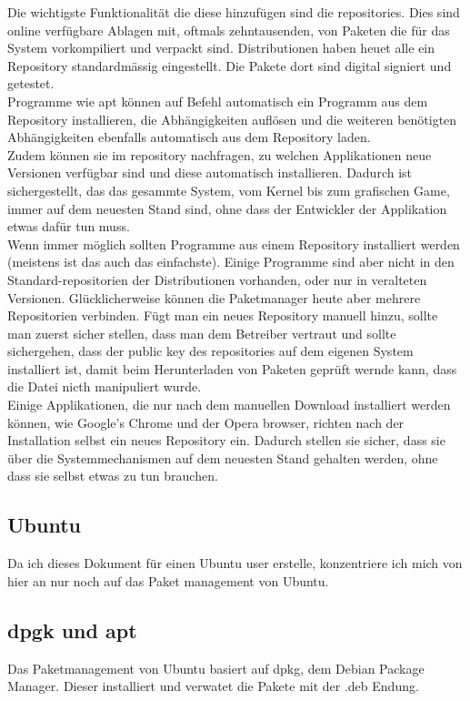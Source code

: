 \documentclass[10pt,paper=a4,final]{scrartcl}
\begin{document}
Die wichtigste Funktionalit\"at die diese hinzuf\"ugen sind die repositories. Dies sind online verf\"ugbare Ablagen mit, oftmals zehntausenden, von Paketen die f\"ur das System vorkompiliert und verpackt sind. Distributionen haben heuet alle ein Repository standardm\"assig eingestellt. Die Pakete dort sind digital signiert und getestet.\\
Programme wie apt k\"onnen auf Befehl automatisch ein Programm aus dem Repository installieren, die Abh\"angigkeiten aufl\"osen und die weiteren ben\"otigten Abh\"angigkeiten ebenfalls automatisch aus dem Repository laden.\\
Zudem k\"onnen sie im repository nachfragen, zu welchen Applikationen neue Versionen verf\"ugbar sind und diese automatisch installieren. Dadurch ist sichergestellt, das das gesammte System, vom Kernel bis zum grafischen Game, immer auf dem neuesten Stand sind, ohne dass der Entwickler der Applikation etwas daf\"ur tun muss.\\
Wenn immer m\"oglich sollten Programme aus einem Repository installiert werden (meistens ist das auch das einfachste). Einige Programme sind aber nicht in den Standard-repositorien der Distributionen vorhanden, oder nur in veralteten Versionen. Gl\"ucklicherweise k\"onnen die Paketmanager heute aber mehrere Repositorien verbinden. F\"ugt man ein neues Repository manuell hinzu, sollte man zuerst sicher stellen, dass man dem Betreiber vertraut und sollte sichergehen, dass der public key des repositories auf dem eigenen System installiert ist, damit beim Herunterladen von Paketen gepr\"uft wernde kann, dass die Datei nicth manipuliert wurde.\\
Einige Applikationen, die nur nach dem manuellen Download installiert werden k\"onnen, wie Google's Chrome und der Opera browser, richten nach der Installation selbst ein neues Repository ein. Dadurch stellen sie sicher, dass sie \"uber die Systemmechanismen auf dem neuesten Stand gehalten werden, ohne dass sie selbst etwas zu tun brauchen.
\subsection{Ubuntu}
Da ich dieses Dokument f\"ur einen Ubuntu user erstelle, konzentriere ich mich von hier an nur noch auf das Paket management von Ubuntu.
\subsection{dpgk und apt}
Das Paketmanagement von Ubuntu basiert auf dpkg, dem Debian Package Manager. Dieser installiert und verwatet die Pakete mit der .deb Endung.
\end{document}
